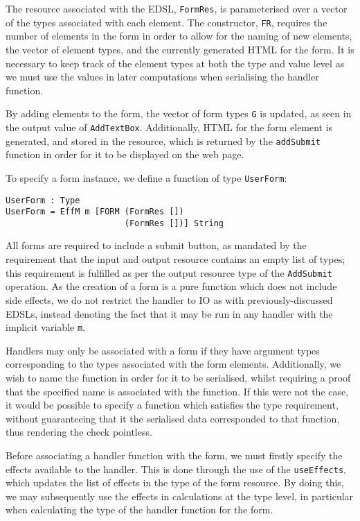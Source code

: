 \documentclass[preprint]{sigplanconf}
\begin{document}
The resource associated with the EDSL, \texttt{FormRes}, is parameterised over a vector of the types associated with each element. The constructor, \texttt{FR}, requires the number of elements in the form in order to allow for the naming of new elements, the vector of element types, and the currently generated HTML for the form. It is necessary to keep track of the element types at both the type and value level as we must use the values in later computations when serialising the handler function. 

By adding elements to the form, the vector of form types \texttt{G} is updated, as seen in the output value of \texttt{AddTextBox}. Additionally, HTML for the form element is generated, and stored in the resource, which is returned by the \texttt{addSubmit} function in order for it to be displayed on the web page.

To specify a form instance, we define a function of type \texttt{UserForm}:
\begin{verbatim}
UserForm : Type
UserForm = EffM m [FORM (FormRes []) 
                        (FormRes [])] String
\end{verbatim}
All forms are required to include a submit button, as mandated by the requirement that the input and output resource contains an empty list of types; this requirement is fulfilled as per the output resource type of the \texttt{AddSubmit} operation. As the creation of a form is a pure function which does not include side effects, we do not restrict the handler to IO as with previously-discussed EDSLs, instead denoting the fact that it may be run in any handler with the implicit variable \texttt{m}.

Handlers may only be associated with a form if they have argument types corresponding to the types associated with the form elements. Additionally, we wish to name the function in order for it to be serialised, whilst requiring a proof that the specified name is associated with the function. If this were not the case, it would be possible to specify a function which satisfies the type requirement, without guaranteeing that it the serialised data corresponded to that function, thus rendering the check pointless. 

Before associating a handler function with the form, we must firstly specify the effects available to the handler. This is done through the use of the \texttt{useEffects}, which updates the list of effects in the type of the form resource. By doing this, we may subsequently use the effects in calculations at the type level, in particular when calculating the type of the handler function for the form. 
\end{document}
